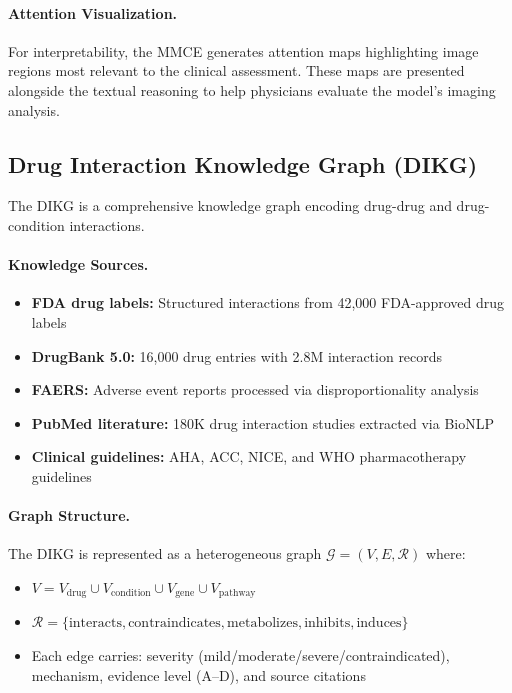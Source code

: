 \documentclass[11pt,a4paper]{article}
\begin{document}
\paragraph{Attention Visualization.} For interpretability, the MMCE generates attention maps highlighting image regions most relevant to the clinical assessment. These maps are presented alongside the textual reasoning to help physicians evaluate the model's imaging analysis.

\subsection{Drug Interaction Knowledge Graph (DIKG)}
\label{sec:dikg}

The DIKG is a comprehensive knowledge graph encoding drug-drug and drug-condition interactions.

\paragraph{Knowledge Sources.}
\begin{itemize}
    \item \textbf{FDA drug labels:} Structured interactions from 42,000 FDA-approved drug labels
    \item \textbf{DrugBank 5.0:} 16,000 drug entries with 2.8M interaction records
    \item \textbf{FAERS:} Adverse event reports processed via disproportionality analysis
    \item \textbf{PubMed literature:} 180K drug interaction studies extracted via BioNLP
    \item \textbf{Clinical guidelines:} AHA, ACC, NICE, and WHO pharmacotherapy guidelines
\end{itemize}

\paragraph{Graph Structure.} The DIKG is represented as a heterogeneous graph $\mathcal{G} = (V, E, \mathcal{R})$ where:
\begin{itemize}
    \item $V = V_{\text{drug}} \cup V_{\text{condition}} \cup V_{\text{gene}} \cup V_{\text{pathway}}$
    \item $\mathcal{R} = \{\text{interacts}, \text{contraindicates}, \text{metabolizes}, \text{inhibits}, \text{induces}\}$
    \item Each edge carries: severity (mild/moderate/severe/contraindicated), mechanism, evidence level (A--D), and source citations
\end{itemize}
\end{document}
